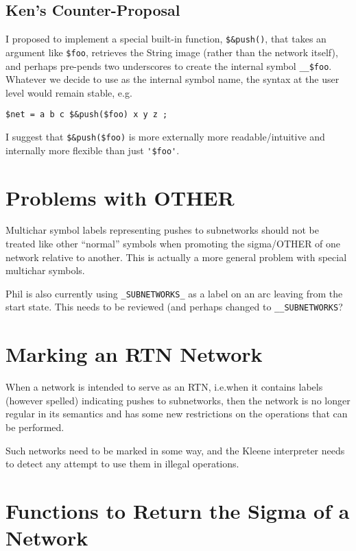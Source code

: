 \documentclass[letterpaper,12pt]{article}
\begin{document}
\subsection{Ken's Counter-Proposal}

I proposed to implement a special built-in function, \verb!$&push()!, that
takes an argument like \verb!$foo!, retrieves the String image (rather than
the network itself), and perhaps pre-pends two underscores to create the
internal symbol \verb!__$foo!.  Whatever we decide to use as the internal
symbol name, the syntax at the user level would remain stable, e.g.

\begin{Verbatim}[fontsize=\small]
$net = a b c $&push($foo) x y z ;
\end{Verbatim}

\noindent
I suggest that \verb!$&push($foo)! is more externally more
readable/intuitive and internally more flexible than just \verb!'$foo'!.

\section{Problems with OTHER}

Multichar symbol labels representing pushes to subnetworks should not be
treated like other ``normal'' symbols when promoting the sigma/OTHER of one
network relative to another.  This is actually a more general problem with
special multichar symbols.

Phil is also currently using \verb!_SUBNETWORKS_! as a label on an arc
leaving from the start state.  This needs to be reviewed (and perhaps
changed to \verb!__SUBNETWORKS!?

\section{Marking an RTN Network}

When a network is intended to serve as an RTN, i.e.\@ when it contains
labels (however spelled) indicating pushes to subnetworks, then the network
is no longer regular in its semantics and has some new restrictions on the
operations that can be performed.

Such networks need to be marked in some way, and the Kleene interpreter
needs to detect any attempt to use them in illegal operations.

\section{Functions to Return the Sigma of a Network}
\end{document}
